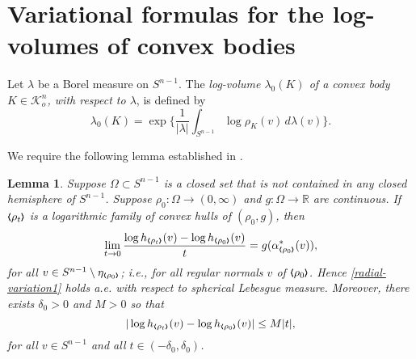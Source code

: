 \documentclass{cpamart1}     %
\newtheorem{lemm}[theo]{Lemma}
\theoremstyle{definition}
\theoremstyle{remark}
\newcommand{\sn}{S^{n-1}}
\newcommand{\kno}{\mathcal K^n_o}
\newcommand{\bla}{\raise.2ex\hbox{$\scriptstyle\pmb \langle$}}
\newcommand{\sbla}{\raise.1ex\hbox{$\scriptscriptstyle\pmb \langle$}}
\newcommand{\bra}{\raise.2ex\hbox{$\scriptstyle\pmb \rangle$}}
\newcommand{\sbra}{\raise.1ex\hbox{$\scriptscriptstyle\pmb \rangle$}}
\begin{document}
\section{Variational formulas for the log-volumes of convex bodies}



Let $\lambda$ be a Borel measure on $\sn$.
The {\it log-volume $\lambda_0(K)$ of a convex body $K\in \kno$,
with respect to $\lambda$}, is defined by
\begin{equation}\label{ent}
 \lambda_0(K)= \exp\Big\{\frac{1}{|\lambda|} \int_{\sn} \log\rho_K(v)\, d\lambda(v) \Big\}.
\end{equation}

We require the following lemma established in \cite{HLYZ16}.

\begin{lemm}\label{lemma4.1}
Suppose
$\Omega \subset \sn$ is a closed set that is not contained
in any closed hemisphere of $\sn$.
Suppose $\rho_0 : \Omega \to (0,\infty)$ and $g: \Omega \to \mathbb R$ are continuous.
If $\bla \rho_{t} \bra$ is a logarithmic family of convex hulls of $(\rho_0, g)$, then
\begin{equation}\label{radial-variation1}
\lim_{t\to 0} \frac{\log h_{\sbla \rho_{t} \sbra } (v)
- \log h_{\sbla \rho_{0} \sbra}(v)} t = g(\alpha_{\sbla \rho_{0} \sbra}^{*}(v)),
\end{equation}
for all $v\in \sn\setminus \eta_{\sbla \rho_{0} \sbra}$; i.e.,
for all regular normals $v$ of ${\bla \rho_{0} \bra}$. Hence
\eqref{radial-variation1} holds a.e. with respect to spherical
Lebesgue measure. Moreover, there exists
 $\delta_0 > 0$ and  $M>0$ so that
\begin{equation*}
|\log h_{\sbla \rho_{t} \sbra } (v) - \log h_{\sbla \rho_{0} \sbra}(v)| \le M |t|,
\end{equation*}
for all $v\in \sn$ and all $t\in (-\delta_0, \delta_0)$.
\end{lemm}
\end{document}
